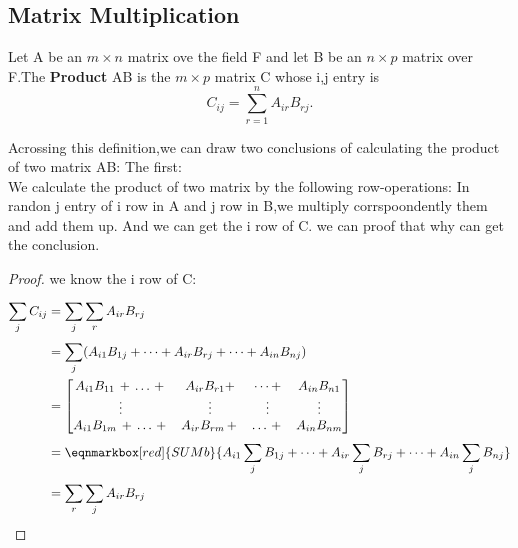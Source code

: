 \subsection{Matrix Multiplication}

\begin{definition}
	Let A be an $m \times n$ matrix ove the field F and let B be an $n \times p$ matrix over F.The \textbf{Product} AB is the $m \times p$ matrix C whose i,j entry is
	\begin{displaymath}
		C_{ij} = \sum\limits_{r = 1}^{n}A_{ir}B_{rj}.
	\end{displaymath}

\end{definition}

\begin{remark}
	Acrossing this definition,we can draw two conclusions of calculating the product of two matrix AB:
	The first:\\
	We calculate the product of two matrix by the following row-operations:
	In randon j entry of i row in A and  j row in B,we multiply corrspoondently them and add them up. And we can get the i row of C.
	we can proof that why can get the conclusion.
	\begin{proof}
		we know the i row of C:\[
			\begin{aligned}[]
				\sum\limits_{j}^{}C_{ij} & = \sum\limits_{j}^{}\sum\limits_{r}^{}A_{ir}B_{rj}                                                                                         \\
				                         & =\sum\limits_{j}^{}(A_{i1}B_{1j}+\dots+A_{ir}B_{rj}+\dots+A_{in}B_{nj})                                                                    \\
				                         & = \begin{bmatrix}
					                             A_{i1}B_{11}\, +\, \dots\, +\, & A_{ir}B_{r1} +     & \dots +     & A_{in}B_{n1} \\
					                             \vdots                         & \vdots             & \vdots      & \vdots       \\
					                             A_{i1}B_{1m}\, +\, \dots\, +\, & A_{ir}B_{rm}\, +\, & \dots\, +\, & A_{in}B_{nm}
				                             \end{bmatrix}                                                         \\
				                         & = \eqnmarkbox[red]{SUMb}{A_{i1}\sum\limits_{j}^{}B_{1j} + \dots + A_{ir}\sum\limits_{j}^{}B_{rj} + \dots + A_{in}\sum\limits_{j}^{}B_{nj}} \\
				                         & = \sum\limits_{r}^{}\sum\limits_{j}^{}A_{ir}B_{rj}
			\end{aligned}
		\]
	\end{proof}

\end{remark}

